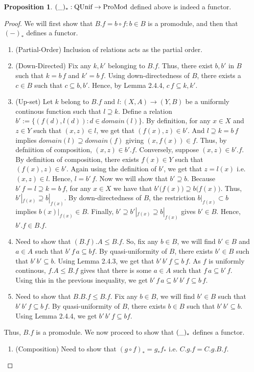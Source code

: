 \documentclass[18pt,a4paper]{article}
\theoremstyle{definition}
\newtheorem{proop}[theorem]{Proposition}
\begin{document}
\begin{proop} $(\string _ )_*:\text{QUnif} \to \text{ProMod}$ defined above is indeed a functor.
\end{proop}
\begin{proof}\setcounter{equation}{0}

	We will first show that $B.f={b \circ f: b \in B}$
	is a promodule, and then that $(-)_*$ defines a functor.
	\begin{enumerate}[label=(\roman*)]
		\item (Partial-Order) Inclusion of relations acts as the partial order.
		\item (Down-Directed) Fix any $k,k'$ belonging to $B.f$. Thus, there exist
			$b,b'$ in $B$ such that $k=b\,f$ and $k'=b\,f$. Using down-directedness
			of $B$, there exists a $c \in B$ such that $c \subseteq b,b'$. Hence,
			by Lemma 2.4.4, $c\,f \subseteq k,k'$.
		\item (Up-set) Let $k$ belong to $B.f$ and $l:(X,A) \to (Y,B)$ be a
			uniformly continous function such that $l \supseteq k$.
			Define a relation $b':= \{(f(d),l(d)): d \in domain(l) \}$.
			By definition, for any $x \in X$ and $z \in Y$ such that $(x,z) \in l$, we get that
			$(f(x),z)\in b'$. And $l \supseteq k=b\, f$ implies $domain(l)  \supseteq domain(f)$
			giving $(x,f(x)) \in f$. Thus, by defniition of composition,
			$(x,z) \in b'.f$. Conversely, suppose $(x,z) \in b'.f$.
			By definition of composition, there exists $f(x)\in Y$ such that
			$(f(x),z) \in b'$. Again using the definition of
			$b'$, we get that $z=l(x)$ i.e. $(x,z)\in l$. Hence, $l=b'\, f$.
			Now we will show that $b'\supseteq b$. Because $b'\, f=l \supseteq k=b\, f$, for any
			$x\in X$ we have that $b'\big(f(x)\big) \supseteq b\big(f(x)\big)$. Thus,
			$b'|_{f(x)} \supseteq b|_{f(x)}$. By down-directedness of $B$,
			the restriction $b|_{f(x)} \subset b$ implies $ b(x)|_{f(x)} \in B$.
			Finally, $b' \supseteq b'|_{f(x)} \supseteq b|_{f(x)}$ gives $b' \in B$.
			Hence, $b'.f \in B.f$.
		\item Need to show that $(B.f).A \leq B.f$. So, fix any $b\in B$, we will find
			$b' \in B$ and $a\in A$ such that $b' \, f\,a \subseteq bf$.
			By quasi-uniformity of $B$, there exists $b' \in B$ such that $b'\,b'
			\subseteq b$. Using Lemma 2.4.3, we get that $b'\,b'\,f \subseteq b\,f$.
			As $f$ is uniformly continous, $f.A \leq B.f$ gives that there is some
			$a \in A \text{ such that } f\,a \subseteq b'\,f$. Using this in the
			previous inequality, we get $b'\,f\,a \subseteq b'\,b'\,f\subseteq  b\,f$.
		\item Need to show that $B.B.f \leq B.f$. Fix any $b \in B$, we will find
			$b' \in B$ such that $b'\,b'\,f \subseteq b\,f$.
			By quasi-uniformity of $B$, there exists $b \in B$ such that
			$b'\,b' \subseteq  b$. Using Lemma 2.4.4, we get $b'\,b'\,f \subseteq bf$.
	\end{enumerate}
	Thus, $B.f$ is a promodule. We now proceed to show that $(\string _)_*$ defines a functor.
	\begin{enumerate}[label=(\roman*)]
		\item (Composition) Need to show that $(g\circ f)_*=g_*f_*$ i.e. $C.g.f=C.g.B.f$.


\end{enumerate}
\end{proof}
\end{document}
